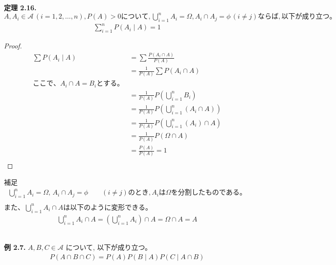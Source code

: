 \documentclass[dvipdfmx,10pt, a4j]{jarticle}
\theoremstyle{definition}
\begin{document}
    \noindent
    \textbf{定理 2.16.} $A, A_i \in \mathcal{A}\, (i = 1, 2, \dots, n), P(A) > 0 について, \bigcup_{i=1}^{n}{A_i} = \Omega, A_i \cap A_j = \phi\, (i \neq j)ならば, 以下が成り立つ。$\\
    \begin{align*}
        \sum_{i=1}^{n}{P(A_i \mid A)} = 1
    \end{align*}
    \begin{proof}
        \begin{align*}
            \sum P(A_i \mid A) &= \sum \frac{P(A_i \cap A)}{P(A)}\\
            &= \frac{1}{P(A)} \sum P(A_i \cap A)\\
            ここで、A_i \cap A = B_i とする。\\
            &= \frac{1}{P(A)} P(\bigcup_{i=1}^{n}{B_i})\\
            &= \frac{1}{P(A)} P(\bigcup_{i=1}^{n}{(A_i \cap A)})\\
            &= \frac{1}{P(A)} P(\bigcup_{i=1}^{n}{(A_i)} \cap A)\\
            &= \frac{1}{P(A)} P(\Omega \cap A)\\
            &= \frac{P(A)}{P(A)} = 1\\
        \end{align*}
    \end{proof}
    \begin{itembox}[l]{補足}
        \begin{align*}
            \bigcup_{i=1}^{n}{A_i} = \Omega,\, A_i \cap A_j = \phi \qquad (i \neq j)のとき, A_i は \Omega を分割したものである。\\
        \end{align*}
        また、$\bigcup_{i=1}^{n}{A_i \cap A}$は以下のように変形できる。\\
        \begin{align*}
            \bigcup_{i=1}^{n}{A_i \cap A} = (\bigcup_{i=1}^{n}{A_i}) \cap A = \Omega \cap A = A
        \end{align*}
    \end{itembox}\\

    \newpage
    \noindent
    \textbf{例 2.7.} $A, B, C \in \mathcal{A}$ について, 以下が成り立つ。\\
    \begin{align*}
        P(A \cap B \cap C) = P(A)P(B \mid A)P(C \mid A \cap B)
    \end{align*}
\end{document}
